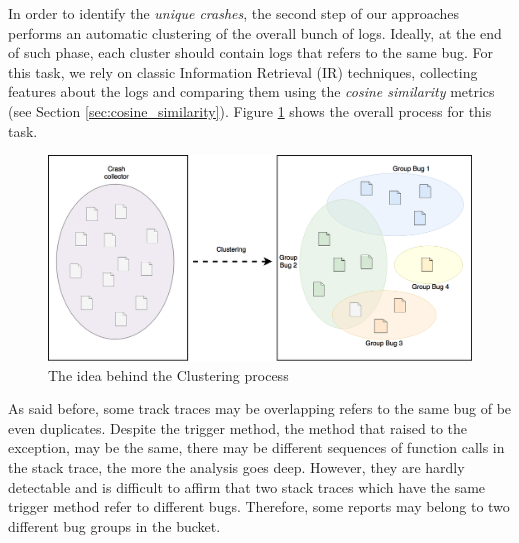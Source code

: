 In order to identify the \textit{unique crashes}, the second step of our approaches performs an automatic clustering of the overall bunch of logs. Ideally, at the end of such phase, each cluster should contain logs that refers to the same bug.
For this task, we rely on classic Information Retrieval (IR) techniques, collecting features about the logs and comparing them using the \textit{cosine similarity} metrics (see Section \ref{sec:cosine_similarity}).
Figure \ref{fig: clustering} shows the overall process for this task. 
\begin{figure}[tb]
\centering 
\includegraphics[width=\columnwidth]{imgs/clusteringidea} 
\caption{The idea behind the Clustering process}
\label{fig: clustering}
\end{figure}
As said before, some track traces may be overlapping \ie refers to the same bug of be even duplicates. 
Despite the trigger method, \ie the method that raised to the exception, may be the same, there may be different sequences of function calls in the stack trace, the more the analysis goes deep. 
However, they are hardly detectable and is difficult to affirm that two stack traces which have the same trigger method refer to different bugs. 
Therefore, some reports may belong to two different bug groups in the bucket. 


